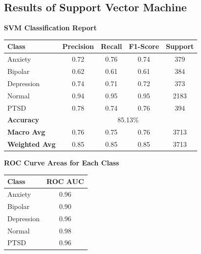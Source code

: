 \pagebreak

\subsection{Results of Support Vector Machine}

\begin{center}
    \textbf{SVM Classification Report} \\[0.5em]
    \begin{tabular}{|l|c|c|c|c|}
        \hline
        \textbf{Class} & \textbf{Precision} & \textbf{Recall} & \textbf{F1-Score} & \textbf{Support} \\ \hline
        Anxiety        & 0.72               & 0.76            & 0.74              & 379              \\ \hline
        Bipolar        & 0.62               & 0.61            & 0.61              & 384              \\ \hline
        Depression     & 0.74               & 0.71            & 0.72              & 373              \\ \hline
        Normal         & 0.94               & 0.95            & 0.95              & 2183             \\ \hline
        PTSD           & 0.78               & 0.74            & 0.76              & 394              \\ \hline
        \textbf{Accuracy} & \multicolumn{4}{|c|}{85.13\%} \\ \hline
        \textbf{Macro Avg} & 0.76            & 0.75            & 0.76              & 3713             \\ \hline
        \textbf{Weighted Avg} & 0.85         & 0.85            & 0.85              & 3713             \\ \hline
    \end{tabular}
\end{center}

\vspace{0.25em}

\begin{center}
    \textbf{ROC Curve Areas for Each Class} \\[0.5em]
    \begin{tabular}{|l|c|}
        \hline
        \textbf{Class}  & \textbf{ROC AUC} \\ \hline
        Anxiety         & 0.96            \\ \hline
        Bipolar         & 0.90            \\ \hline
        Depression      & 0.96            \\ \hline
        Normal          & 0.98            \\ \hline
        PTSD            & 0.96            \\ \hline
    \end{tabular}
\end{center}

